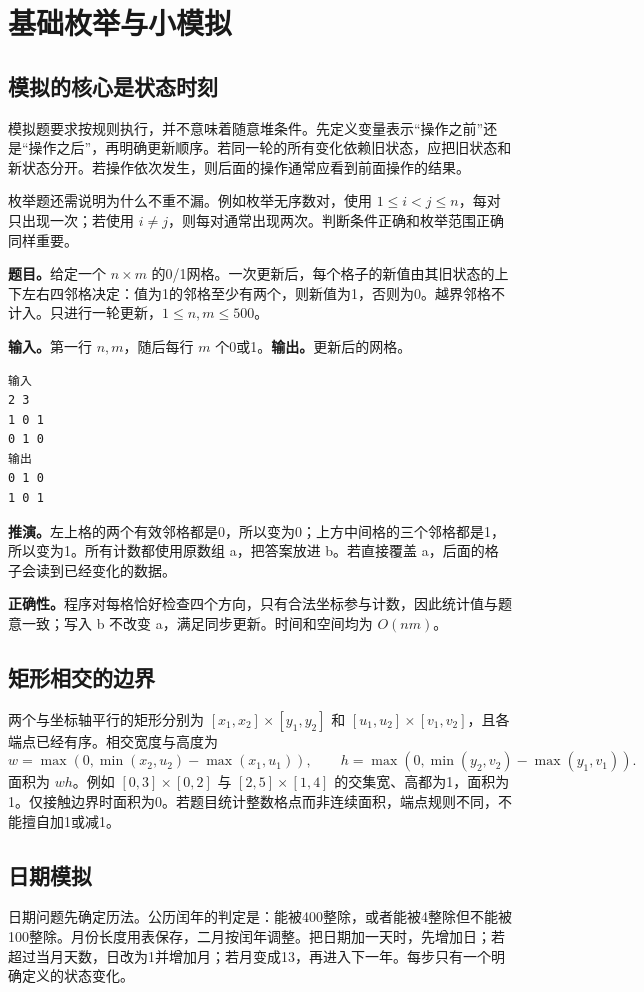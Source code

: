 \section{基础枚举与小模拟}
\subsection{模拟的核心是状态时刻}
模拟题要求按规则执行，并不意味着随意堆条件。先定义变量表示“操作之前”还是“操作之后”，再明确更新顺序。若同一轮的所有变化依赖旧状态，应把旧状态和新状态分开。若操作依次发生，则后面的操作通常应看到前面操作的结果。

枚举题还需说明为什么不重不漏。例如枚举无序数对，使用 $1\le i<j\le n$，每对只出现一次；若使用 $i\ne j$，则每对通常出现两次。判断条件正确和枚举范围正确同样重要。

\textbf{题目。}给定一个 $n\times m$ 的0/1网格。一次更新后，每个格子的新值由其旧状态的上下左右四邻格决定：值为1的邻格至少有两个，则新值为1，否则为0。越界邻格不计入。只进行一轮更新，$1\le n,m\le500$。

\textbf{输入。}第一行 $n,m$，随后每行 $m$ 个0或1。\textbf{输出。}更新后的网格。
\begin{verbatim}
输入
2 3
1 0 1
0 1 0
输出
0 1 0
1 0 1
\end{verbatim}
\textbf{推演。}左上格的两个有效邻格都是0，所以变为0；上方中间格的三个邻格都是1，所以变为1。所有计数都使用原数组 a，把答案放进 b。若直接覆盖 a，后面的格子会读到已经变化的数据。

\textbf{正确性。}程序对每格恰好检查四个方向，只有合法坐标参与计数，因此统计值与题意一致；写入 b 不改变 a，满足同步更新。时间和空间均为 $O(nm)$。

\subsection{矩形相交的边界}
两个与坐标轴平行的矩形分别为 $[x_1,x_2]\times[y_1,y_2]$ 和 $[u_1,u_2]\times[v_1,v_2]$，且各端点已经有序。相交宽度与高度为
\[
w=\max(0,\min(x_2,u_2)-\max(x_1,u_1)),\qquad
h=\max(0,\min(y_2,v_2)-\max(y_1,v_1)).
\]
面积为 $wh$。例如 $[0,3]\times[0,2]$ 与 $[2,5]\times[1,4]$ 的交集宽、高都为1，面积为1。仅接触边界时面积为0。若题目统计整数格点而非连续面积，端点规则不同，不能擅自加1或减1。

\subsection{日期模拟}
日期问题先确定历法。公历闰年的判定是：能被400整除，或者能被4整除但不能被100整除。月份长度用表保存，二月按闰年调整。把日期加一天时，先增加日；若超过当月天数，日改为1并增加月；若月变成13，再进入下一年。每步只有一个明确定义的状态变化。

